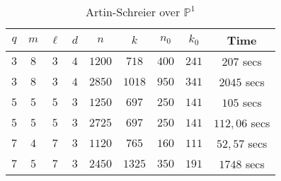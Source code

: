 \documentclass[a4paper]{article}
\begin{document}
\begin{table}[h]
\begin{center}
\begin{tabular}{|c|c|c|c|c|c|c|c|c|}
    \hline
   $q$ & $m$ & $\ell$ & $d$ & $n$ & $k$ & $n_0$ & $k_0$ & \textbf{Time}  \\
   \hline
     $3$& $8$ & $3$ & $4$ & $1200$ & $718$ & $400$ & $241$ & $207$ secs \\
     \hline
       $3$ & $8$ & $3$ & $4$ & $2850$ & $1018$ & $950$ & $341$ & $2045$ secs\\
     \hline
       $5$& $5$ & $5$ & $3$ & $1250$ & $697$ & $250$ & $141$ & $105$ secs \\
     \hline
       $5$& $5$&$5$ &$3$ &$2725$ &$697$ &$250$ &$141$ & $112,06$ secs \\
     \hline
       $7$&$4$ &$7$ &$3$ &$1120$ &$765$ &$160$ &$111$ &$52,57$ secs \\
     \hline
       $7$&$5$ &$7$ &$3$ &$2450$ &$1325$ &$350$ &$191$ & $1748$ secs\\
     \hline
\end{tabular}
\caption{Artin-Schreier over $\mathbb{P}^1$}
\end{center}
\end{table}
\end{document}

